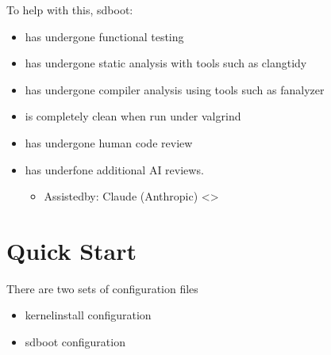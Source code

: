 \documentclass[letterpaper,11pt,english]{sphinxmanual}
\begin{document}
\sphinxAtStartPar
To help with this, sd\sphinxhyphen{}boot:
\begin{itemize}
\item {} 
\sphinxAtStartPar
has undergone functional testing

\item {} 
\sphinxAtStartPar
has undergone static analysis with tools such as clang\sphinxhyphen{}tidy

\item {} 
\sphinxAtStartPar
has undergone compiler analysis using tools such as \sphinxhyphen{}fanalyzer

\item {} 
\sphinxAtStartPar
is completely clean when run under valgrind

\item {} 
\sphinxAtStartPar
has undergone human code review

\item {} 
\sphinxAtStartPar
has underfone additional AI reviews.
\begin{itemize}
\item {} 
\sphinxAtStartPar
Assisted\sphinxhyphen{}by: Claude (Anthropic) <>

\end{itemize}

\end{itemize}


\section{Quick Start}
\label{\detokenize{Readme:quick-start}}
\sphinxAtStartPar
There are two sets of configuration files
\begin{itemize}
\item {} 
\sphinxAtStartPar
kernel\sphinxhyphen{}install configuration

\item {} 
\sphinxAtStartPar
sd\sphinxhyphen{}boot configuration

\end{itemize}
\end{document}
